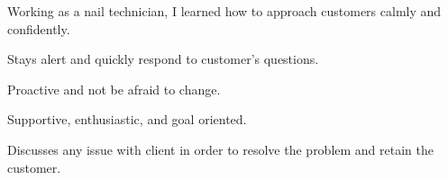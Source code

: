 

\begin{cventries}

  \cventry
    {} %
    {} %
    {} %
    {} %
    {
      \begin{cvitems} %
      \item Working as a nail technician, I learned how to approach customers calmly and confidently.
      \item Stays alert and quickly respond to customer's questions.
      \item Proactive and not be afraid to change.
      \item Supportive, enthusiastic, and goal oriented.
      \item Discusses any issue with client in order to resolve the problem and retain the customer.
      \end{cvitems}
    }


\end{cventries}
